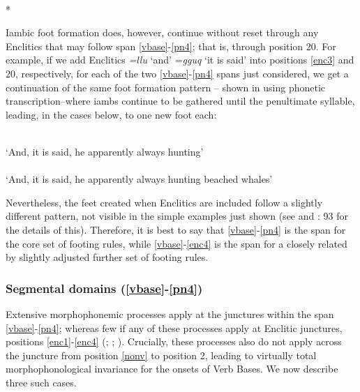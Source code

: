 \documentclass[output=paper]{langscibook}
\begin{document}
\ea\label{ex:key:40}
\ea\label{ex:key:40a}
 \\
\ex\label{ex:key:40b}
* 
\z
\z

Iambic foot formation does, however, continue without reset through any Enclitics that may follow span \ref{vbase}-\ref{pn4}; that is, through position 20. For example, if we add Enclitics \textit{=llu} `and' =\textit{gguq} `it is said' into positions \ref{enc3} and 20, respectively, for each of the two \ref{vbase}-\ref{pn4} spans just considered, we get a continuation of the same foot formation pattern -- shown in  using phonetic transcription--where iambs continue to be gathered until the penultimate syllable, leading, in the cases below, to one new foot each:

\ea\label{ex:key:41}
\ea\label{ex:key:41a}
 \MVRightarrow [(pi.ˈsu:.)(tu.ˈɬi:.)(ni.ˈlu:.)(ni.ˈ\textbf{=ɬu:.)=xuq}] \\
 `And, it is said, he apparently always hunting' \\
\ex\label{ex:key:41b}
\MVRightarrow [(ma.ˈɬu:.)(su.ˈtu:.)(ɬi.ˈni:.)(lu.ˈni:.)=\textbf{ɬu.=xuq}] \\ 
`And, it is said, he apparently always hunting beached whales' \\
\z
\z

Nevertheless, the feet created when Enclitics are included follow a slightly different pattern, not visible in the simple examples just shown (see \citealt{Miyaoka1985} and \citealt{Woodbury2002}: 93 for the details of this). Therefore, it is best to say that \ref{vbase}-\ref{pn4} is the span for the core set of footing rules, while \ref{vbase}-\ref{enc4} is the span for a closely related by slightly adjusted further set of footing rules.

\subsubsection{Segmental domains (\ref{vbase}-\ref{pn4})} \label{sec:5.7.2}

Extensive morphophonemic processes apply at the junctures within the span \ref{vbase}-\ref{pn4}; whereas few if any of these processes apply at Enclitic junctures, positions \ref{enc1}-\ref{enc4} (\citealt{Reed1977}; \citealt{Woodbury1981}; \citealt{Miyaoka2012}). Crucially, these processes also do not apply across the juncture from position \ref{nonv} to position 2, leading to virtually total morphophonological invariance for the onsets of Verb Bases. We now describe three such cases.
\end{document}
